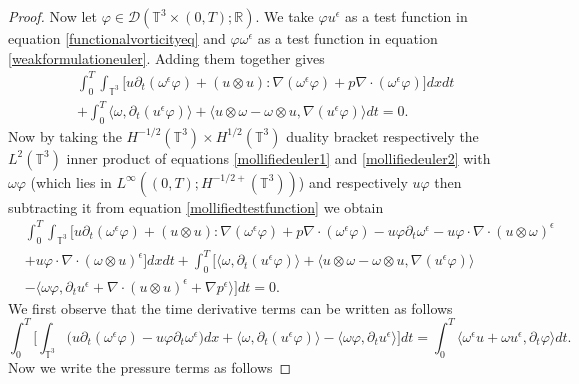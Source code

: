 \documentclass[12pt,a4paper]{article}
\theoremstyle{definition}
\theoremstyle{remark}
\numberwithin{equation}{section}
\begin{document}
\begin{proof}
Now let $\varphi \in \mathcal{D} (\mathbb{T}^3 \times (0,T); \mathbb{R})$. We take $\varphi u^\epsilon$ as a test function in equation \eqref{functionalvorticityeq} and $\varphi \omega^\epsilon$ as a test function in equation \eqref{weakformulationeuler}. Adding them together gives
\begin{align}
&\int_0^T \int_{\mathbb{T}^3} \bigg[ u \partial_t (\omega^\epsilon \varphi) + (u \otimes u) : \nabla (\omega^\epsilon \varphi) + p \nabla \cdot (\omega^\epsilon \varphi) \bigg] dx dt \nonumber \\
&+ \int_0^T \langle \omega, \partial_t (u^\epsilon \varphi) \rangle + \langle u \otimes \omega - \omega \otimes u, \nabla (u^\epsilon \varphi ) \rangle dt = 0. \label{mollifiedtestfunction}
\end{align}
Now by taking the $H^{-1/2} (\mathbb{T}^3) \times H^{1/2} (\mathbb{T}^3)$ duality bracket respectively the $L^2 (\mathbb{T}^3)$ inner product of equations \eqref{mollifiedeuler1} and \eqref{mollifiedeuler2} with $\omega \varphi$ (which lies in $L^\infty ((0,T); H^{-1/2+} (\mathbb{T}^3))$) and respectively $u \varphi$ then subtracting it from equation \eqref{mollifiedtestfunction} we obtain
\begin{align*}
&\int_0^T \int_{\mathbb{T}^3} \bigg[ u \partial_t (\omega^\epsilon \varphi) + (u \otimes u) : \nabla (\omega^\epsilon \varphi) + p \nabla \cdot (\omega^\epsilon \varphi) - u \varphi \partial_t \omega^\epsilon -  u \varphi \cdot \nabla \cdot (u \otimes \omega)^\epsilon \\
&+  u \varphi \cdot \nabla \cdot (\omega \otimes u)^\epsilon \bigg] dx dt + \int_0^T \bigg[ \langle \omega, \partial_t (u^\epsilon \varphi) \rangle + \langle u \otimes \omega - \omega \otimes u, \nabla (u^\epsilon \varphi ) \rangle  \\
&- \langle \omega \varphi, \partial_t u^\epsilon + \nabla \cdot ( u \otimes u)^\epsilon + \nabla p^\epsilon \rangle \bigg] dt= 0.
\end{align*}
We first observe that the time derivative terms can be written as follows
\begin{equation*}
\int_0^T \bigg[ \int_{\mathbb{T}^3} \big(u \partial_t (\omega^\epsilon \varphi) - u \varphi \partial_t \omega^\epsilon \big) dx + \langle \omega, \partial_t (u^\epsilon \varphi) \rangle - \langle \omega \varphi, \partial_t u^\epsilon \rangle \bigg] dt = \int_0^T \langle \omega^\epsilon u + \omega u^\epsilon, \partial_t \varphi \rangle dt.
\end{equation*}
Now we write the pressure terms as follows

\end{proof}
\end{document}
